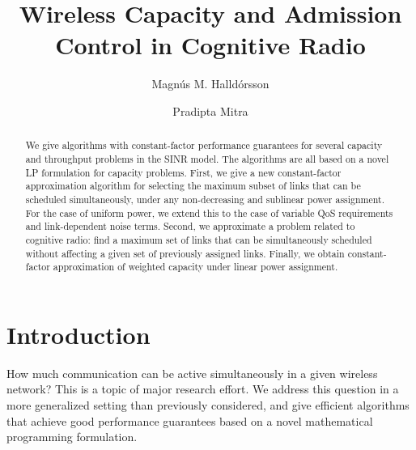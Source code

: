 \documentclass[11pt]{amsart}
\title{Wireless Capacity and Admission Control in Cognitive Radio}
\author[M. M. Halld\'orsson]{Magn\'us M. Halld\'orsson}
\author[P. Mitra]{Pradipta Mitra}
\begin{document}
\begin{abstract}
We give algorithms with constant-factor performance guarantees for
several capacity and throughput problems in the SINR model.  The
algorithms are all based on a novel LP formulation for capacity
problems.  First, we give a new constant-factor approximation
algorithm for selecting the maximum subset of links that can be
scheduled simultaneously, under any non-decreasing and sublinear power assignment.
For the case of uniform power, we extend this to the case of variable QoS requirements and link-dependent
noise terms. 
Second, we approximate a problem related to cognitive radio: find a maximum set of links that can be simultaneously scheduled without affecting a given set of previously assigned links.
Finally, we obtain constant-factor approximation of weighted capacity under linear power assignment.

\iffalse
We give a constant-factor approximation algorithm for 
We formulate the wireless capacity problem in the SINR model as a Linear program. We show how to use it
to get an alternative algorithm to achieve a constant approximation to wireless capacity for all non-decreasing,
sub-linear power assignments.

We show the effectiveness of our approach by finding improved algorithms for a number of variations
of the capacity problem, including: For uniform power, capacity with variable QoS and noise requirements,
for uniform and bi-directional mean power admission control and cognitive radio, and for linear power
the weighted capacity problem.
\fi
\end{abstract}



\maketitle 
\section{Introduction}
How much communication can be active simultaneously in a given wireless network?
This is a topic of major research effort. We address this question in
a more generalized setting than previously considered, and give
efficient algorithms that achieve good performance guarantees based on
a novel mathematical programming formulation. 
\end{document}
